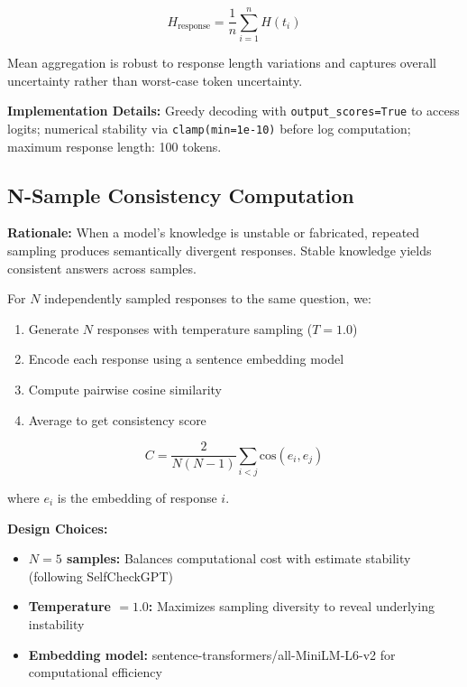 \begin{equation}
H_{\text{response}} = \frac{1}{n} \sum_{i=1}^{n} H(t_i)
\end{equation}

Mean aggregation is robust to response length variations and captures overall uncertainty rather than worst-case token uncertainty.

\textbf{Implementation Details:} Greedy decoding with \texttt{output\_scores=True} to access logits; numerical stability via \texttt{clamp(min=1e-10)} before log computation; maximum response length: 100 tokens.

\subsection{N-Sample Consistency Computation}

\textbf{Rationale:} When a model's knowledge is unstable or fabricated, repeated sampling produces semantically divergent responses. Stable knowledge yields consistent answers across samples.

For $N$ independently sampled responses to the same question, we:

\begin{enumerate}
    \item Generate $N$ responses with temperature sampling ($T=1.0$)
    \item Encode each response using a sentence embedding model
    \item Compute pairwise cosine similarity
    \item Average to get consistency score
\end{enumerate}

\begin{equation}
C = \frac{2}{N(N-1)} \sum_{i < j} \text{cos}(e_i, e_j)
\end{equation}

where $e_i$ is the embedding of response $i$.

\textbf{Design Choices:}
\begin{itemize}
    \item \textbf{$N=5$ samples:} Balances computational cost with estimate stability (following SelfCheckGPT)
    \item \textbf{Temperature $= 1.0$:} Maximizes sampling diversity to reveal underlying instability
    \item \textbf{Embedding model:} sentence-transformers/all-MiniLM-L6-v2 for computational efficiency
\end{itemize}

